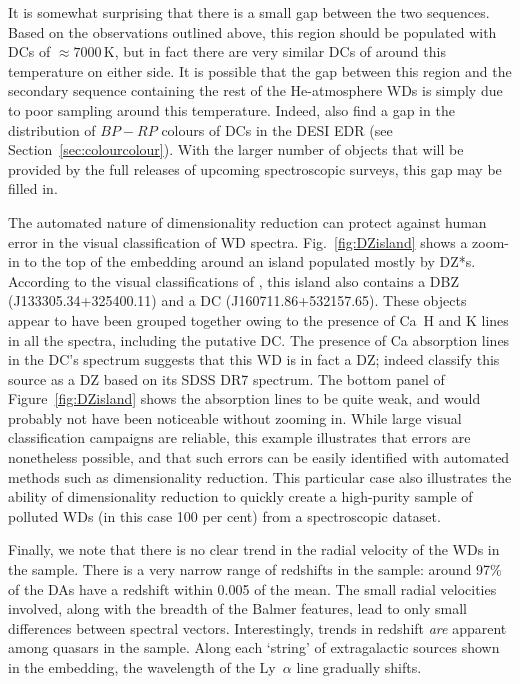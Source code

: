 \documentclass[fleqn,usenatbib]{mnras}
\begin{document}
It is somewhat surprising that there is a small gap between the two sequences.
Based on the observations outlined above, this region should be populated with DCs of $\approx7000\,\text{K}$, but in fact there are very similar DCs of around this temperature on either side.
It is possible that the gap between this region and the secondary sequence containing the rest of the He-atmosphere WDs is simply due to poor sampling around this temperature.
Indeed, \citet{manser24} also find a gap in the distribution of $\mathit{BP}-\mathit{RP}$ colours of DCs in the DESI EDR (see Section~\ref{sec:colourcolour}).
With the larger number of objects that will be provided by the full releases of upcoming spectroscopic surveys, this gap may be filled in.

The automated nature of dimensionality reduction can protect against human error in the visual classification of WD spectra.
Fig.~\ref{fig:DZisland} shows a zoom-in to the top of the embedding around an island populated mostly by DZ*s.
According to the visual classifications of \citet{manser24}, this island also contains a DBZ (J133305.34+325400.11) and a DC (J160711.86+532157.65).
These objects appear to have been grouped together owing to the presence of Ca~H and K lines in all the spectra, including the putative DC.
The presence of Ca absorption lines in the DC's spectrum suggests that this WD is in fact a DZ; indeed \citet{kleinman13} classify this source as a DZ based on its SDSS DR7 spectrum.
The bottom panel of Figure~\ref{fig:DZisland} shows the absorption lines to be quite weak, and would probably not have been noticeable without zooming in.
While large visual classification campaigns are reliable, this example illustrates that errors are nonetheless possible, and that such errors can be easily identified with automated methods such as dimensionality reduction.
This particular case also illustrates the ability of dimensionality reduction to quickly create a high-purity sample of polluted WDs (in this case 100 per cent) from a spectroscopic dataset.

Finally, we note that there is no clear trend in the radial velocity of the WDs in the sample.
There is a very narrow range of redshifts in the sample: around 97\% of the DAs have a redshift within 0.005 of the mean.
The small radial velocities involved, along with the breadth of the Balmer features, lead to only small differences between spectral vectors.
Interestingly, trends in redshift \textit{are} apparent among quasars in the sample.
Along each `string' of extragalactic sources shown in the embedding, the wavelength of the Ly~$\alpha$ line gradually shifts.
\end{document}

